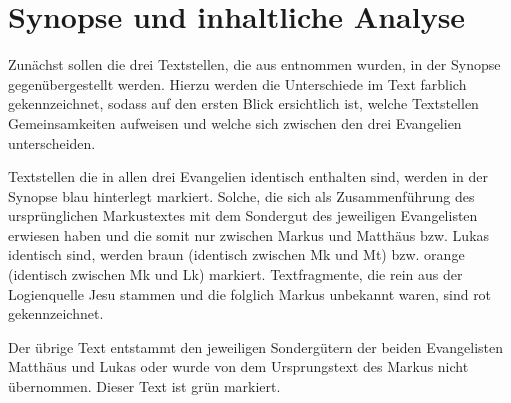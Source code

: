 \section{Synopse und inhaltliche Analyse}
Zunächst sollen die drei Textstellen, die aus \cite{CP75} entnommen wurden, in der Synopse gegenübergestellt werden. Hierzu werden die Unterschiede im Text farblich gekennzeichnet, sodass auf den ersten Blick ersichtlich ist, welche Textstellen Gemeinsamkeiten aufweisen und welche sich zwischen den drei Evangelien unterscheiden.

Textstellen die in allen drei Evangelien identisch enthalten sind, werden in der Synopse blau hinterlegt markiert. Solche, die sich als Zusammenführung des ursprünglichen Markustextes mit dem Sondergut des jeweiligen Evangelisten erwiesen haben und die somit nur zwischen Markus und Matthäus bzw. Lukas identisch sind, werden braun (identisch zwischen Mk und Mt) bzw. orange (identisch zwischen Mk und Lk) markiert.
Textfragmente, die rein aus der Logienquelle Jesu stammen und die folglich Markus unbekannt waren, sind rot gekennzeichnet.

Der übrige Text entstammt den jeweiligen Sondergütern der beiden Evangelisten Matthäus und Lukas oder wurde von dem Ursprungstext des Markus nicht übernommen. Dieser Text ist grün markiert.




